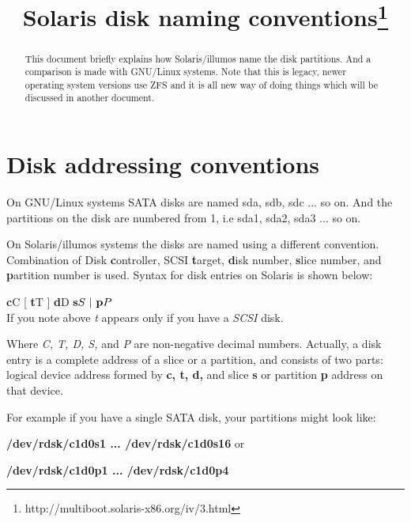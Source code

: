 \documentclass{article}
\title{Solaris disk naming conventions\footnote{http://multiboot.solaris-x86.org/iv/3.html}}
\author{}
\date{}
\begin{document}
\maketitle

\begin{abstract}
  This document briefly explains how Solaris/illumos name the disk
  partitions. And a comparison is made with GNU/Linux systems. Note that this is
  legacy, newer operating system versions use ZFS and it is all new way of doing
  things which will be discussed in another document.
\end{abstract}

\section*{Disk addressing conventions}

On GNU/Linux systems SATA disks are named sda, sdb, sdc ... so on. And
the partitions on the disk are numbered from 1, i.e sda1, sda2, sda3 ... so
on.\vspace{0.1in}

On Solaris/illumos systems the disks are named using a different
convention. Combination of Disk {\bf c}ontroller, SCSI {\bf t}arget, {\bf d}isk
number, {\bf s}lice number, and {\bf p}artition number is used. Syntax for disk
entries on Solaris is shown below:\vspace{0.1in}

{\bf c}C [ {\bf t}T ] {\bf d}D \( {\bf s}S \ | \ {\bf p}P \) \vspace{0.1in}
\\
If you note above {\em t} appears only if you have a {\em SCSI} disk. \vspace{0.1in}

Where {\em C, T, D, S,} and {\em P} are non-negative decimal numbers. Actually,
a disk entry is a complete address of a slice or a partition, and consists of
two parts: logical device address formed by {\bf c, t, d,} and slice {\bf s} or
partition {\bf p} address on that device.\vspace{0.1in}

For example if you have a single SATA disk, your partitions might look like:\vspace{0.1in}

{\bf /dev/rdsk/c1d0s1 ... /dev/rdsk/c1d0s16} or

{\bf /dev/rdsk/c1d0p1 ... /dev/rdsk/c1d0p4}
\end{document}
